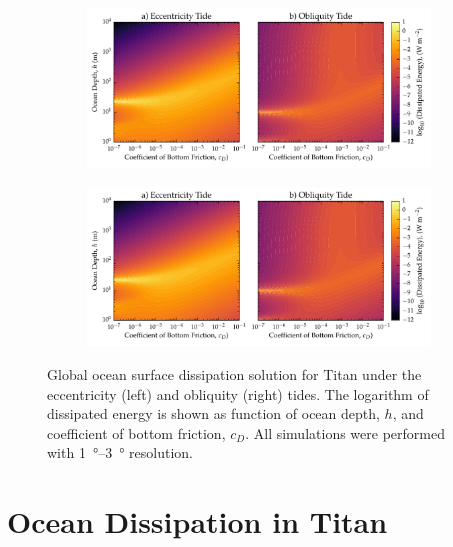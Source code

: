 \begin{figure}[!t]
    \centering
    \begin{subfigure}[t]{0.9\linewidth} %
        \includegraphics[width=\linewidth]{Figures/titan_bottom}
        \label{fig:botEccTitan}
    \end{subfigure}
    \begin{subfigure}[t]{0\linewidth} %
         \includegraphics[width=\linewidth]{Figures/titan_bottom}
         \label{fig:botObliqTitan}   
    \end{subfigure}
    \vspace{-0.5cm}
\caption{Global ocean surface dissipation solution for Titan under the eccentricity (left) and obliquity (right) tides. The logarithm of dissipated energy is shown as function of ocean depth, $h$, and coefficient of bottom friction, $c_D$. All simulations were performed with \SIrange{1}{3}{\degree} resolution. \label{fig:botTitan}}
\end{figure}



\section{Ocean Dissipation in Titan \label{sec:results_Titan}}


